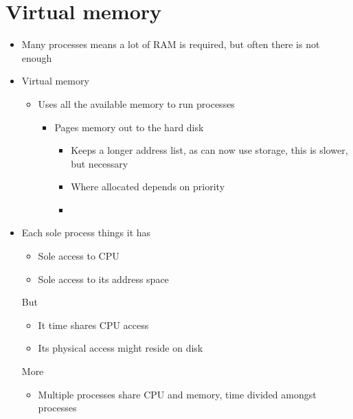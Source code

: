 \documentclass{article}[18pt]
\begin{document}
\section{Virtual memory}
\begin{itemize}
	\item Many processes means a lot of RAM is required, but often there is not enough
	\item Virtual memory
	\begin{itemize}
		\item Uses all the available memory to run processes
		\begin{itemize}
			\item Pages memory out to the hard disk
			\begin{itemize}
				\item Keeps a longer address list, as can now use storage, this is slower, but necessary
				\item Where allocated depends on priority
				\item 
			\end{itemize}
		\end{itemize}
	\end{itemize}
	\item Each sole process things it has
	\begin{itemize}
		\item Sole access to CPU
		\item Sole access to its address space
	\end{itemize}
	
	But
	\begin{itemize}
		\item It time shares CPU access
		\item Its physical access might reside on disk
	\end{itemize}
	More
	\begin{itemize}
		\item Multiple processes share CPU and memory, time divided amongst processes
	\end{itemize}
\end{itemize}
\end{document}
